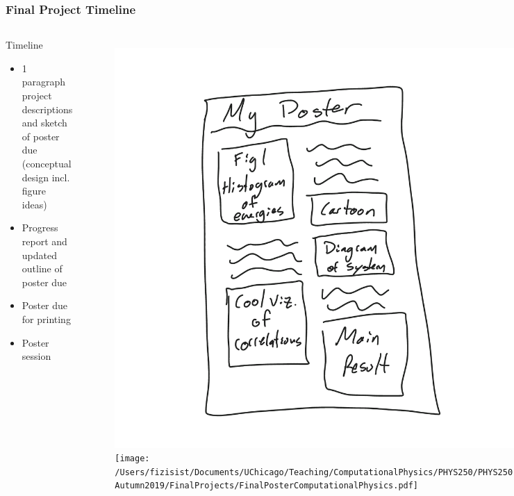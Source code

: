 \documentclass[hyperref={colorlinks=true}]{beamer}
\begin{document}

\begin{frame}%
  \frametitle{Final Project Timeline}

  \begin{columns}
  
    
    
  \begin{ucblock}{Timeline}
    \begin{itemize}
      \item {} 1 paragraph project descriptions and sketch of poster due (conceptual design incl. figure ideas)
      \item {} Progress report and updated outline of poster due
      \item {} Poster due for printing
      \item {} Poster session
    \end{itemize}
  \end{ucblock}
  
  
  \vspace{-1cm}
  
  \begin{figure}
    \includegraphics[width=0.9\columnwidth]{../Lecture3/PosterConcept.png}\\
    \texttt{[image: /Users/fizisist/Documents/UChicago/Teaching/ComputationalPhysics/PHYS250/PHYS250-Autumn2019/FinalProjects/FinalPosterComputationalPhysics.pdf]}\\
  \end{figure}

  
  \end{columns}

  
\end{frame}
\end{document}
